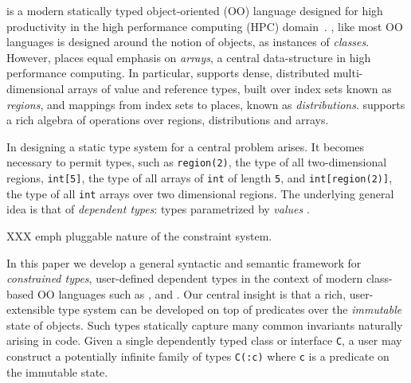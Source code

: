 
%

%
%
%

\Xten{} is a modern statically typed object-oriented (OO) language
designed for high productivity in the high performance computing (HPC)
domain~\cite{X10}. \Xten{}, like most OO languages is designed around the notion
of objects, as instances of {\em classes}. However, \Xten{} places
equal emphasis on {\em arrays}, a central data-structure in high
performance computing. In particular, \Xten{} supports dense,
distributed multi-dimensional arrays of value and reference types,
built over index sets known as {\em regions}, and mappings from index
sets to places, known as {\em distributions}.  \Xten{} supports a rich
algebra of operations over regions, distributions and arrays.

In designing a static type system for \Xten{} a central problem
arises. It becomes necessary to permit types, such as {\tt region(2)},
the type of all two-dimensional regions, {\tt int[5]}, the type of
all arrays of {\tt int} of length {\tt 5}, and {\tt int[region(2)]},
the type of all {\tt int} arrays over two dimensional regions.
The underlying
general idea is that of {\em dependent types}: types
parametrized by {\em values} \cite{dependent-types,xi99dependent}.

XXX emph pluggable nature of the constraint system.


In this paper we develop a general syntactic and semantic framework
for {\em constrained types}, user-defined dependent types
in the context of modern class-based
OO languages such as \java{}, \csharp{} and \Xten{}. Our central
insight is that a rich, user-extensible type system can be developed
on top of predicates over the {\em immutable} state of objects. Such
types statically capture many common invariants naturally arising in
code. Given a single dependently typed class or interface {\tt C}, a
user may construct a potentially infinite family of types {\tt C(:c)}
where {\tt c} is a predicate on the immutable state.

